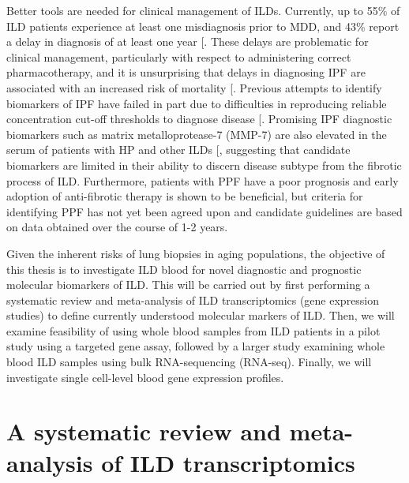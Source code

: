 \documentclass[
]{article}
\begin{document}
Better tools are needed for clinical management of ILDs. Currently, up to 55\% of ILD patients experience at least one misdiagnosis prior to MDD, and 43\% report a delay in diagnosis of at least one year {[}\citeproc{ref-grewal_role_2019}{29}{]}. These delays are problematic for clinical management, particularly with respect to administering correct pharmacotherapy, and it is unsurprising that delays in diagnosing IPF are associated with an increased risk of mortality {[}\citeproc{ref-lamas_delayed_2011}{30}{]}. Previous attempts to identify biomarkers of IPF have failed in part due to difficulties in reproducing reliable concentration cut-off thresholds to diagnose disease {[}\citeproc{ref-drakopanagiotakis_biomarkers_2018}{31}{]}. Promising IPF diagnostic biomarkers such as matrix metalloprotease-7 (MMP-7) are also elevated in the serum of patients with HP and other ILDs {[}\citeproc{ref-morais_serum_2015}{32}{]}, suggesting that candidate biomarkers are limited in their ability to discern disease subtype from the fibrotic process of ILD. Furthermore, patients with PPF have a poor prognosis and early adoption of anti-fibrotic therapy is shown to be beneficial, but criteria for identifying PPF has not yet been agreed upon and candidate guidelines are based on data obtained over the course of 1-2 years.

Given the inherent risks of lung biopsies in aging populations, the objective of this thesis is to investigate ILD blood for novel diagnostic and prognostic molecular biomarkers of ILD. This will be carried out by first performing a systematic review and meta-analysis of ILD transcriptomics (gene expression studies) to define currently understood molecular markers of ILD. Then, we will examine feasibility of using whole blood samples from ILD patients in a pilot study using a targeted gene assay, followed by a larger study examining whole blood ILD samples using bulk RNA-sequencing (RNA-seq). Finally, we will investigate single cell-level blood gene expression profiles.

\clearpage

\section{A systematic review and meta-analysis of ILD transcriptomics}\label{a-systematic-review-and-meta-analysis-of-ild-transcriptomics}

\renewcommand{\thefigure}{2.\arabic{figure}}
\setcounter{figure}{0}
\renewcommand{\thetable}{2.\arabic{table}}
\setcounter{table}{0}
\renewcommand{\theequation}{2.\arabic{equation}}
\setcounter{equation}{0}
\end{document}
